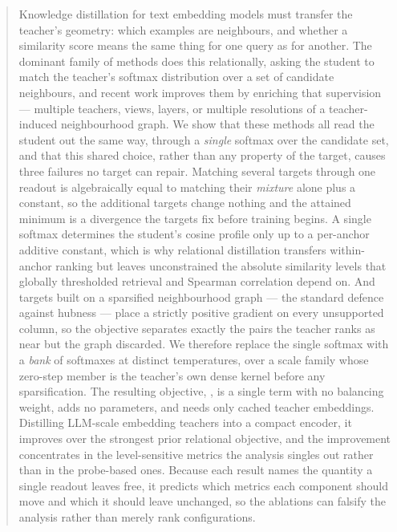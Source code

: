 \begin{abstract}
Knowledge distillation for text embedding models must transfer the teacher's geometry:
which examples are neighbours, and whether a similarity score means the same thing for one
query as for another. The dominant family of methods does this relationally, asking the
student to match the teacher's softmax distribution over a set of candidate neighbours, and
recent work improves them by enriching that supervision --- multiple teachers, views,
layers, or multiple resolutions of a teacher-induced neighbourhood graph. We show that these
methods all read the student out the same way, through a \emph{single} softmax over the
candidate set, and that this shared choice, rather than any property of the target, causes
three failures no target can repair. Matching several targets through one readout is
algebraically equal to matching their \emph{mixture} alone plus a constant, so the
additional targets change nothing and the attained minimum is a divergence the targets fix
before training begins. A single softmax determines the student's cosine profile only up to
a per-anchor additive constant, which is why relational distillation transfers within-anchor
ranking but leaves unconstrained the absolute similarity levels that globally thresholded
retrieval and Spearman correlation depend on. And targets built on a sparsified
neighbourhood graph --- the standard defence against hubness --- place a strictly positive
gradient on every unsupported column, so the objective separates exactly the pairs the
teacher ranks as near but the graph discarded. We therefore replace the single softmax with
a \emph{bank} of softmaxes at distinct temperatures, over a scale family whose zero-step
member is the teacher's own dense kernel before any sparsification. The resulting objective,
\method, is a single term with no balancing weight, adds no parameters, and needs only
cached teacher embeddings. Distilling LLM-scale embedding teachers into a compact encoder,
it improves over the strongest prior relational objective, and the improvement concentrates
in the level-sensitive metrics the analysis singles out rather than in the probe-based ones.
Because each result names the quantity a single readout leaves free, it predicts which
metrics each component should move and which it should leave unchanged, so the ablations can
falsify the analysis rather than merely rank configurations.
\end{abstract}
